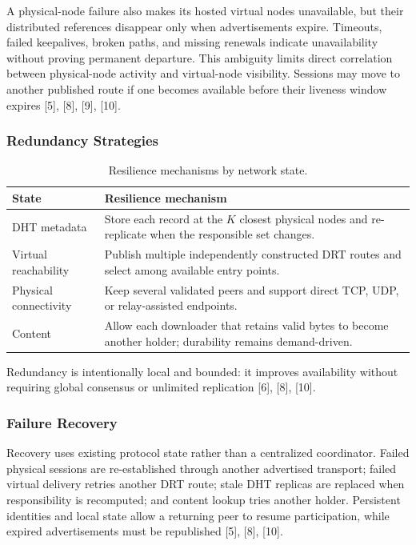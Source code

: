 \documentclass[12pt]{article}
\begin{document}
A physical-node failure also makes its hosted virtual nodes unavailable, but their
distributed references disappear only when advertisements expire. Timeouts, failed
keepalives, broken paths, and missing renewals indicate unavailability without proving
permanent departure. This ambiguity limits direct correlation between physical-node
activity and virtual-node visibility. Sessions may move to another published route if
one becomes available before their liveness window expires [5], [8], [9], [10].

\subsubsection{Redundancy Strategies}

\begin{table}[H]
\centering
\caption{Resilience mechanisms by network state.}
\label{tab:resilience-mechanisms}
\begin{tabularx}{\textwidth}{L{0.24\textwidth} Y}
\toprule
\textbf{State} & \textbf{Resilience mechanism} \\
\midrule
DHT metadata & Store each record at the $K$ closest physical nodes and re-replicate
when the responsible set changes. \\
Virtual reachability & Publish multiple independently constructed DRT routes and
select among available entry points. \\
Physical connectivity & Keep several validated peers and support direct TCP, UDP,
or relay-assisted endpoints. \\
Content & Allow each downloader that retains valid bytes to become another holder;
durability remains demand-driven. \\
\bottomrule
\end{tabularx}
\end{table}

Redundancy is intentionally local and bounded: it improves availability without
requiring global consensus or unlimited replication [6], [8], [10].

\subsubsection{Failure Recovery}

Recovery uses existing protocol state rather than a centralized coordinator. Failed
physical sessions are re-established through another advertised transport; failed
virtual delivery retries another DRT route; stale DHT replicas are replaced when
responsibility is recomputed; and content lookup tries another holder. Persistent
identities and local state allow a returning peer to resume participation, while
expired advertisements must be republished [5], [8], [10].
\end{document}

